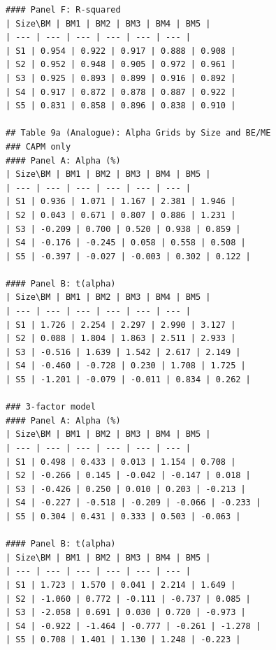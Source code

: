 \begin{verbatim}
#### Panel F: R-squared
| Size\BM | BM1 | BM2 | BM3 | BM4 | BM5 |
| --- | --- | --- | --- | --- | --- |
| S1 | 0.954 | 0.922 | 0.917 | 0.888 | 0.908 |
| S2 | 0.952 | 0.948 | 0.905 | 0.972 | 0.961 |
| S3 | 0.925 | 0.893 | 0.899 | 0.916 | 0.892 |
| S4 | 0.917 | 0.872 | 0.878 | 0.887 | 0.922 |
| S5 | 0.831 | 0.858 | 0.896 | 0.838 | 0.910 |

## Table 9a (Analogue): Alpha Grids by Size and BE/ME
### CAPM only
#### Panel A: Alpha (%)
| Size\BM | BM1 | BM2 | BM3 | BM4 | BM5 |
| --- | --- | --- | --- | --- | --- |
| S1 | 0.936 | 1.071 | 1.167 | 2.381 | 1.946 |
| S2 | 0.043 | 0.671 | 0.807 | 0.886 | 1.231 |
| S3 | -0.209 | 0.700 | 0.520 | 0.938 | 0.859 |
| S4 | -0.176 | -0.245 | 0.058 | 0.558 | 0.508 |
| S5 | -0.397 | -0.027 | -0.003 | 0.302 | 0.122 |

#### Panel B: t(alpha)
| Size\BM | BM1 | BM2 | BM3 | BM4 | BM5 |
| --- | --- | --- | --- | --- | --- |
| S1 | 1.726 | 2.254 | 2.297 | 2.990 | 3.127 |
| S2 | 0.088 | 1.804 | 1.863 | 2.511 | 2.933 |
| S3 | -0.516 | 1.639 | 1.542 | 2.617 | 2.149 |
| S4 | -0.460 | -0.728 | 0.230 | 1.708 | 1.725 |
| S5 | -1.201 | -0.079 | -0.011 | 0.834 | 0.262 |

### 3-factor model
#### Panel A: Alpha (%)
| Size\BM | BM1 | BM2 | BM3 | BM4 | BM5 |
| --- | --- | --- | --- | --- | --- |
| S1 | 0.498 | 0.433 | 0.013 | 1.154 | 0.708 |
| S2 | -0.266 | 0.145 | -0.042 | -0.147 | 0.018 |
| S3 | -0.426 | 0.250 | 0.010 | 0.203 | -0.213 |
| S4 | -0.227 | -0.518 | -0.209 | -0.066 | -0.233 |
| S5 | 0.304 | 0.431 | 0.333 | 0.503 | -0.063 |

#### Panel B: t(alpha)
| Size\BM | BM1 | BM2 | BM3 | BM4 | BM5 |
| --- | --- | --- | --- | --- | --- |
| S1 | 1.723 | 1.570 | 0.041 | 2.214 | 1.649 |
| S2 | -1.060 | 0.772 | -0.111 | -0.737 | 0.085 |
| S3 | -2.058 | 0.691 | 0.030 | 0.720 | -0.973 |
| S4 | -0.922 | -1.464 | -0.777 | -0.261 | -1.278 |
| S5 | 0.708 | 1.401 | 1.130 | 1.248 | -0.223 |

\end{verbatim}